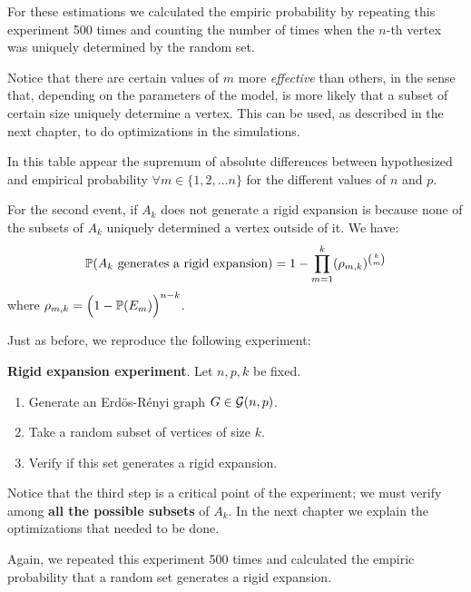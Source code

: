 For these estimations we calculated the empiric probability by repeating this experiment 500 times and counting the number of times when the $n$-th vertex was uniquely determined by the random set.

Notice that there are certain values of $m$ more \textit{effective} than others, in the sense that, depending on the parameters of the model, is more likely that a subset of certain size uniquely determine a vertex. This can be used, as described in the next chapter, to do optimizations in the simulations.

In this table appear the supremum of absolute differences between hypothesized and empirical probability $\forall m \in \{1,2, \dots n\}$ for the different values of $n$ and $p$.

\vspace{0.3cm} 

\vspace{-0.3cm}

For the second event, if $A_k$ does not generate a rigid expansion is because none of the subsets of $A_{k}$ uniquely determined a vertex outside of it. We have:
$$\P(A_k \text{ generates a rigid expansion}) = 1 -  \prod_{m=1}^{k} (\rho_{m,k})^{\binom{k}{m}}$$
where $\rho_{m,k} = \Big(1 -  \P(E_m)\Big)^{n-k}$.

Just as before, we reproduce the following experiment:
 
\begin{cajita}
\textbf{Rigid expansion experiment}. Let $n,p,k$ be fixed.
\begin{enumerate}
\item Generate an Erdös-Rényi graph $G\in \G(n,p)$.
\item Take a random subset of vertices of size $k$.
\item Verify if this set generates a rigid expansion.
\end{enumerate}
\end{cajita}

Notice that the third step is a critical point of the experiment; we must verify among \textbf{all the possible subsets} of $A_{k}$. In the next chapter we explain the optimizations that needed to be done.

Again, we repeated this experiment 500 times and calculated the empiric probability that a random set generates a rigid expansion.

